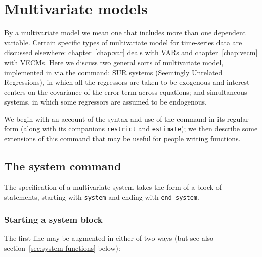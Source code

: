 \chapter{Multivariate models}
\label{chap:system}

By a multivariate model we mean one that includes more than one
dependent variable. Certain specific types of multivariate model for
time-series data are discussed elsewhere: chapter~\ref{chap:var} deals
with VARs and chapter~\ref{chap:vecm} with VECMs. Here we discuss two
general sorts of multivariate model, implemented in  via
the  command: SUR systems (Seemingly Unrelated
Regressions), in which all the regressors are taken to be exogenous
and interest centers on the covariance of the error term across
equations; and simultaneous systems, in which some regressors are
assumed to be endogenous.

We begin with an account of the syntax and use of the 
command in its regular form (along with its companions
\texttt{restrict} and \texttt{estimate}); we then describe some
extensions of this command that may be useful for people writing
functions.

\section{The system command}
\label{sec:system-regular}

The specification of a multivariate system takes the form of a block
of statements, starting with \texttt{system} and ending with
\texttt{end system}. 

\subsection{Starting a system block}

The first line may be augmented in either of two ways (but see also
section~\ref{sec:system-functions} below):

